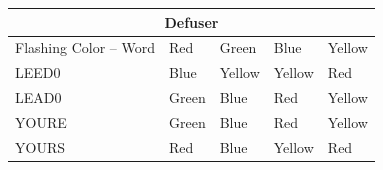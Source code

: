 \documentclass{article}
\begin{document}
\begin{center}
\begin{tabular}{ |p{3cm}||p{2cm}|p{2cm}|p{2cm}|p{2cm}| }
 \hline
 \multicolumn{5}{|c|}{Defuser} \\
 \hline
 Flashing Color -- Word& Red & Green & Blue & Yellow\\
 \hline
 LEED0   & Blue    &Yellow&   Yellow & Red\\
 \hline
 LEAD0   & Green    &Blue&   Red & Yellow\\
 \hline
 YOURE   & Green    &Blue&   Red & Yellow\\
 \hline
 YOURS   & Red    &Blue&   Yellow & Red\\
 \hline
\end{tabular}
\end{center}

\newpage
\BgThispage
\thispagestyle{empty}
\end{document}

